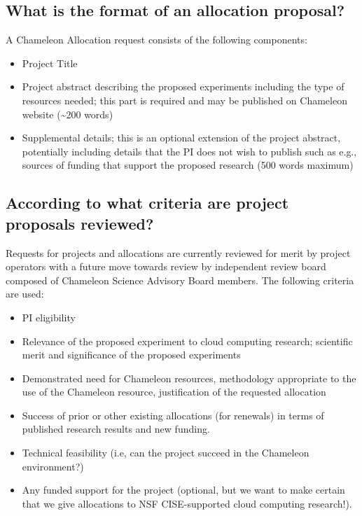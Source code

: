 \subsection{What is the format of an allocation
proposal?}\label{what-is-the-format-of-an-allocation-proposal}

A Chameleon Allocation request consists of the following components:

\begin{itemize}
\tightlist
\item
  Project Title
\item
  Project abstract describing the proposed experiments including the
  type of resources needed; this part is required and may be published
  on Chameleon website (\textasciitilde{}200 words)
\item
  Supplemental details; this is an optional extension of the project
  abstract, potentially including details that the PI does not wish to
  publish such as e.g., sources of funding that support the proposed
  research (500 words maximum)
\end{itemize}

\subsection{According to what criteria are project proposals
reviewed?}\label{according-to-what-criteria-are-project-proposals-reviewed}

Requests for projects and allocations are currently reviewed for merit
by project operators with a future move towards review by independent
review board composed of Chameleon Science Advisory Board members. The
following criteria are used:

\begin{itemize}
\tightlist
\item
  PI eligibility
\item
  Relevance of the proposed experiment to cloud computing research;
  scientific merit and significance of the proposed experiments
\item
  Demonstrated need for Chameleon resources, methodology appropriate to
  the use of the Chameleon resource, justification of the requested
  allocation
\item
  Success of prior or other existing allocations (for renewals) in terms
  of published research results and new funding.
\item
  Technical feasibility (i.e, can the project succeed in the Chameleon
  environment?)
\item
  Any funded support for the project (optional, but we want to make
  certain that we give allocations to NSF CISE-supported cloud computing
  research!).
\end{itemize}

